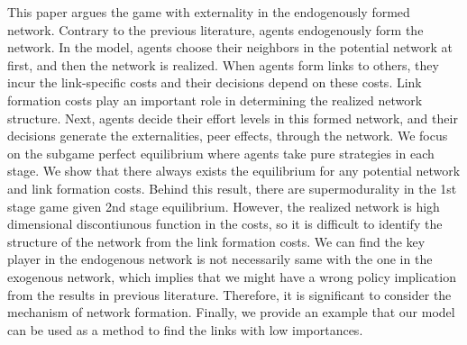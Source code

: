 \documentclass[12pt]{article}
\theoremstyle{definition}
\begin{document}
This paper argues the game with externality in the endogenously formed network.
Contrary to the previous literature, agents endogenously form the network.
In the model, agents choose their neighbors in the potential network at first, and then the network is realized.
When agents form links to others, they incur the link-specific costs and their decisions depend on these costs.
Link formation costs play an important role in determining the realized network structure.
Next, agents decide their effort levels in this formed network, and their decisions generate the externalities, peer effects, through the network.
We focus on the subgame perfect equilibrium where agents take pure strategies in each stage.
We show that there always exists the equilibrium for any potential network and link formation costs.
Behind this result, there are supermodurality in the 1st stage game given 2nd stage equilibrium.
However, the realized network is high dimensional discontiunous function in the costs, so it is difficult to identify the structure of the network from the link formation costs.
We can find the key player in the endogenous network is not necessarily same with the one in the exogenous network, which implies that we might have a wrong policy implication from the results in previous literature.
Therefore, it is significant to consider the mechanism of network formation.
Finally, we provide an example that our model can be used as a method to find the links with low importances.
\end{document}
